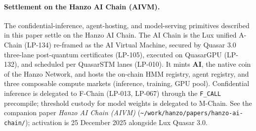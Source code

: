 \paragraph{Settlement on the Hanzo AI Chain (AIVM).}
The confidential-inference, agent-hosting, and model-serving primitives
described in this paper settle on the Hanzo AI Chain. The AI Chain is
the Lux unified A-Chain (LP-134) re-framed as the AI Virtual Machine,
secured by Quasar 3.0 three-lane post-quantum certificates (LP-105),
executed on QuasarGPU (LP-132), and scheduled per QuasarSTM lanes
(LP-010). It mints \textbf{AI}, the native coin of the Hanzo Network,
and hosts the on-chain HMM registry, agent registry, and three composable
compute markets (inference, training, GPU pool). Confidential inference
is delegated to F-Chain (LP-013, LP-067) through the \texttt{F\_CALL}
precompile; threshold custody for model weights is delegated to M-Chain.
See the companion paper \emph{Hanzo AI Chain (AIVM)}
(\texttt{\textasciitilde/work/hanzo/papers/hanzo-ai-chain/}); activation
is 25 December 2025 alongside Lux Quasar 3.0.

